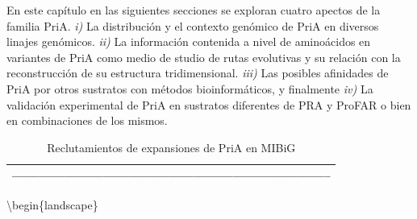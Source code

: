 \documentclass[]{article}
\begin{document}
En este capítulo en las siguientes secciones se exploran cuatro apectos
de la familia PriA. \emph{i)} La distribución y el contexto genómico de
PriA en diversos linajes genómicos. \emph{ii)} La información contenida
a nivel de aminoácidos en variantes de PriA como medio de studio de
rutas evolutivas y su relación con la reconstrucción de su estructura
tridimensional. \emph{iii)} Las posibles afinidades de PriA por otros
sustratos con métodos bioinformáticos, y finalmente \emph{iv)} La
validación experimental de PriA en sustratos diferentes de PRA y ProFAR
o bien en combinaciones de los mismos.

\begin{longtable}[]{@{}l@{}}
\caption{Reclutamientos de expansiones de PriA en MIBiG
\label{tab:cineticos}}\tabularnewline
\toprule
--------------------------------------------------------------------------\tabularnewline
\bottomrule
\end{longtable}

\clearpage    

\textbackslash{}begin\{landscape\}
\end{document}
